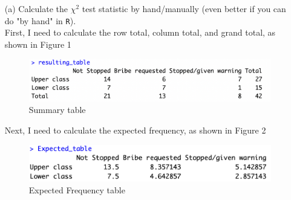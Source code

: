 \documentclass[12pt,letterpaper]{article}
\begin{document}
\begin{enumerate}
	
	\item [(a)]
	Calculate the $\chi^2$ test statistic by hand/manually (even better if you can do "by hand" in \texttt{R}).\\
	
	  First, I need to calculate the row total, column total, and grand total, as shown in Figure 1\\
	  \begin{figure}[h!]
	  	\caption{\footnotesize{Summary table}}
	  	\vspace{.5cm}
	  	\centering
	  	\label{fig:1.1 Summary table}
	  	\includegraphics[width=1.1\textwidth]{1.1.png}
	  \end{figure}
	  
	  	Next, I need to calculate the expected frequency, as shown in Figure 2\\
	  	\begin{figure}[h!]
	  	\caption{\footnotesize{Expected Frequency table}}
	  	\vspace{.5cm}
	  	\centering
	  	\label{fig:1.2 Expected Frequency table}
	  	\includegraphics[width=1.1\textwidth]{1.2.png}
	  \end{figure}
	  

\end{enumerate}
\end{document}
